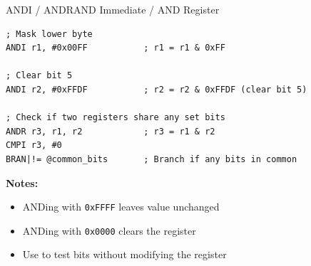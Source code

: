 \begin{instructionbox}{ANDI / ANDR}{AND Immediate / AND Register}
	\begin{example}
		\begin{lstlisting}
; Mask lower byte
ANDI r1, #0x00FF           ; r1 = r1 & 0xFF

; Clear bit 5
ANDI r2, #0xFFDF           ; r2 = r2 & 0xFFDF (clear bit 5)

; Check if two registers share any set bits
ANDR r3, r1, r2            ; r3 = r1 & r2
CMPI r3, #0
BRAN|!= @common_bits       ; Branch if any bits in common
		\end{lstlisting}
		\caption{Bit Masking and Clearing with AND}
	\end{example}

	\textbf{Notes:}
	\begin{itemize}
		\item ANDing with \texttt{0xFFFF} leaves value unchanged
		\item ANDing with \texttt{0x0000} clears the register
		\item Use  to test bits without modifying the register
	\end{itemize}
\end{instructionbox}

